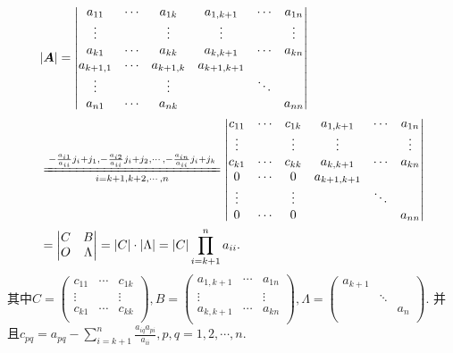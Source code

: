 \documentclass[../../main.tex]{subfiles}%
\begin{document}
\begin{solution}
\begin{align*}
&|\boldsymbol{A}|=\left| \begin{matrix}
a_{11}&		\cdots&		a_{1k}&		a_{1,k+1}&		\cdots&		a_{1n}\\
\vdots&		&		\vdots&		\vdots&		&		\vdots\\
a_{k1}&		\cdots&		a_{kk}&		a_{k,k+1}&		\cdots&		a_{kn}\\
a_{k+1,1}&		\cdots&		a_{k+1,k}&		a_{k+1,k+1}&		&		\\
\vdots&		&		\vdots&		&		\ddots&		\\
a_{n1}&		\cdots&		a_{nk}&		&		&		a_{nn}\\
\end{matrix} \right|
\\
&\xlongequal[i=k+1,k+2,\cdots ,n]{-\frac{a_{i1}}{a_{ii}}j_i+j_1,-\frac{a_{i2}}{a_{ii}}j_i+j_2,\cdots ,-\frac{a_{in}}{a_{ii}}j_i+j_k}\left| \begin{matrix}
c_{11}&		\cdots&		c_{1k}&		a_{1,k+1}&		\cdots&		a_{1n}\\
\vdots&		&		\vdots&		\vdots&		&		\vdots\\
c_{k1}&		\cdots&		c_{kk}&		a_{k,k+1}&		\cdots&		a_{kn}\\
0&		\cdots&		0&		a_{k+1,k+1}&		&		\\
\vdots&		&		\vdots&		&		\ddots&		\\
0&		\cdots&		0&		&		&		a_{nn}\\
\end{matrix} \right|
\\
&=\left| \begin{matrix}
C&		B\\
O&		\Lambda\\
\end{matrix} \right|=|C|\cdot |\Lambda |=|C|\prod_{i=k+1}^n{a_{ii}}.
\end{align*}
其中$C=\left( \begin{matrix}
c_{11}&		\cdots&		c_{1k}\\
\vdots&		&		\vdots\\
c_{k1}&		\cdots&		c_{kk}\\
\end{matrix} \right) ,B=\left( \begin{matrix}
a_{1,k+1}&		\cdots&		a_{1n}\\
\vdots&		&		\vdots\\
a_{k,k+1}&		\cdots&		a_{kn}\\
\end{matrix} \right) ,\Lambda =\left( \begin{matrix}
a_{k+1}&		&		\\
&		\ddots&		\\
&		&		a_n\\
\end{matrix} \right).$
并且$c_{pq}=a_{pq}-\sum_{i=k+1}^n{\frac{a_{iq}a_{pi}}{a_{ii}}},p,q=1,2,\cdots ,n$.

\end{solution}
\end{document}
